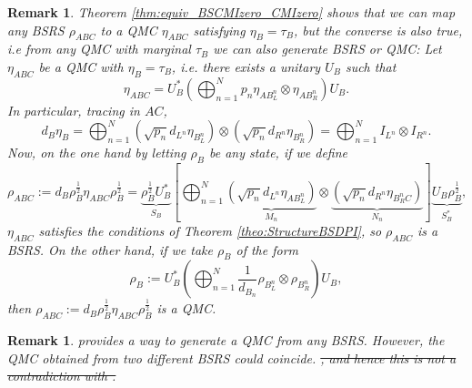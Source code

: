 \documentclass[11pt]{article}
\theoremstyle{newdefinition}
\theoremstyle{newplain}
\newtheorem{remark}[definition]{Remark}
\theoremstyle{myplain}
\DeclareMathOperator{\1}{\mathds{1}}
\newcommand{\PCR}[1]{{\color{blue}#1}}
\begin{document}
\begin{remark}\label{remark:ConverseEta}
Theorem \ref{thm:equiv_BSCMIzero_CMIzero} shows that we can map any BSRS $\rho_{ABC}$ to a QMC $\eta_{ABC}$ satisfying $\eta_B=\tau_B$, but the converse is also true, i.e from any QMC with marginal $\tau_B$ we can also generate BSRS \PCR{or QMC}:  Let $\eta_{ABC}$ be a QMC with $\eta_B=\tau_B$, i.e. there exists a unitary $U_B$ such that
     \begin{equation}
         \eta_{ABC}=U_B^* \left( \bigoplus_{n=1}^N p_n \eta_{AB_L^n}\otimes\eta_{AB_R^n}   \right)U_B.
     \end{equation}
     In particular, tracing in $AC$,
     \begin{equation}
         d_B \eta_B=\bigoplus_{n=1}^N \left(\sqrt{p_n}d_{L^n}\eta_{B_L^n}\right)\otimes \left(\sqrt{p_n}d_{R^n}\eta_{B_R^n}\right)=\bigoplus_{n=1}^N I_{L^n} \otimes I_{R^n}.
     \end{equation}
     Now, \PCR{on the one hand by} letting $\rho_B$ be any state, if we define
     \begin{equation}
         \rho_{ABC}:=d_B \rho_B^{\frac{1}{2}}\eta_{ABC}\rho_B^{\frac{1}{2}}=\underbrace{\rho_B^{\frac{1}{2}}U_B^*}_{S_B}\left[  \bigoplus_{n=1}^N \underbrace{\left(\sqrt{p_n}d_{L^n}\eta_{AB_L^n}\right)}_{M_n}\otimes \underbrace{\left(\sqrt{p_n}d_{R^n}\eta_{B_R^nC}\right)}_{N_n}  \right]\underbrace{U_B\rho_B^{\frac{1}{2}}}_{S_B^*},
     \end{equation}
     $\eta_{ABC}$ satisfies the conditions of Theorem \ref{theo:StructureBSDPI}, so $\rho_{ABC}$ is a BSRS. \PCR{On the other hand, if we take $\rho_B$ of the form
     \begin{equation}
         \rho_B:=U_B^*\left( \bigoplus_{n=1}^N \frac{1}{d_{B_n}}\rho_{B_L^n}\otimes\rho_{B_R^n}  \right)U_B,
     \end{equation}
     then $\rho_{ABC}:=d_B \rho_B^{\frac{1}{2}}\eta_{ABC}\rho_B^{\frac{1}{2}}$ is a QMC. }
\end{remark}
\begin{remark}
      provides a way to generate a QMC from any BSRS. However, the QMC obtained from two different BSRS could coincide\PCR{. \sout{, and hence this is not a contradiction with \Cref{rem:measure}.}}
\end{remark}
\end{document}
